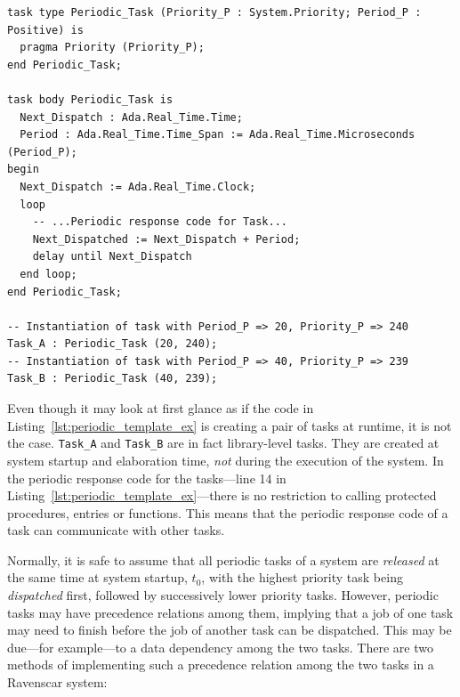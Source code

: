 \begin{minipage}{\listingwidth}
\lstset{language=ada,
  numbers=left,
  numberstyle=\tiny
}
\begin{lstlisting}[firstnumber=1, label=lst:periodic_template_ex,
    caption=Two Ravenscar periodic tasks instantiated from templates.]
task type Periodic_Task (Priority_P : System.Priority; Period_P : Positive) is
  pragma Priority (Priority_P);
end Periodic_Task;

task body Periodic_Task is
  Next_Dispatch : Ada.Real_Time.Time;
  Period : Ada.Real_Time.Time_Span := Ada.Real_Time.Microseconds (Period_P);
begin
  Next_Dispatch := Ada.Real_Time.Clock;
  loop
    -- ...Periodic response code for Task...
    Next_Dispatched := Next_Dispatch + Period;
    delay until Next_Dispatch
  end loop;
end Periodic_Task;

-- Instantiation of task with Period_P => 20, Priority_P => 240
Task_A : Periodic_Task (20, 240);
-- Instantiation of task with Period_P => 40, Priority_P => 239
Task_B : Periodic_Task (40, 239);
\end{lstlisting}
\end{minipage}

Even though it may look at first glance as if the code in
Listing~\ref{lst:periodic_template_ex} is creating a pair of tasks at
runtime, it is not the case. \texttt{Task\_A} and \texttt{Task\_B} are
in fact library-level tasks. They are created at system startup and
elaboration time, \emph{not} during the execution of the system. In
the periodic response code for the tasks---line 14 in
Listing~\ref{lst:periodic_template_ex}---there is no restriction to
calling protected procedures, entries or functions. This means that
the periodic response code of a task can communicate with other
tasks.

Normally, it is safe to assume that all periodic tasks of a system are
\emph{released} at the same time at system startup, $t_0$, with the
highest priority task being \emph{dispatched} first, followed by
successively lower priority tasks. However, periodic tasks may have
precedence relations among them, implying that a job of one task may
need to finish before the job of another task can be dispatched. This
may be due---for example---to a data dependency among the two
tasks. There are two methods of implementing such a precedence
relation among the two tasks in a Ravenscar system:

